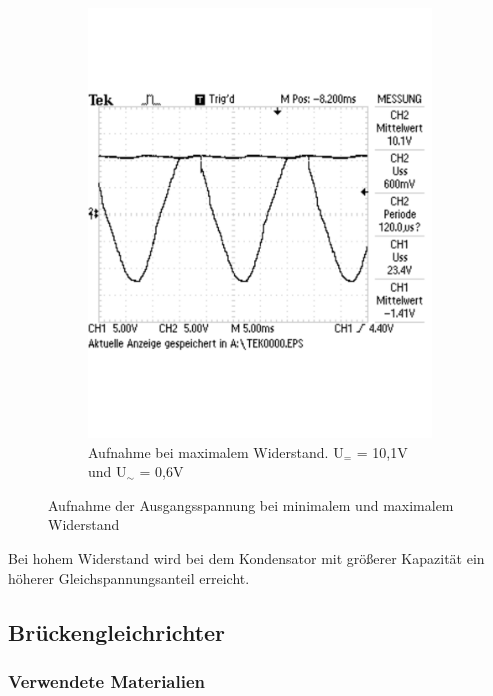 \documentclass[12pt,a4paper]{article}
\begin{document}
\begin{figure}[H]
\begin{subfigure}[b]{0.48\textwidth}
                \includegraphics[width=\textwidth , scale = 0.4]{2_5_1000F_2.pdf}
                \caption[Aufnahme bei maximalem Widerstand. U$_{=}$ = 10,1V und U$_\sim$ = 0,6V]{Aufnahme bei maximalem Widerstand. U$_{=}$ = 10,1V und U$_\sim$ = 0,6V}
  				\label{fig:2_5_1000F_2}
        \end{subfigure}
        \caption{Aufnahme der Ausgangsspannung bei minimalem und maximalem Widerstand}
        \label{fig:2_5_1000F}
\end{figure}

Bei hohem Widerstand wird bei dem Kondensator mit größerer Kapazität ein höherer Gleichspannungsanteil erreicht.

\subsection{Brückengleichrichter}
\subsubsection{Verwendete Materialien}
\end{document}
